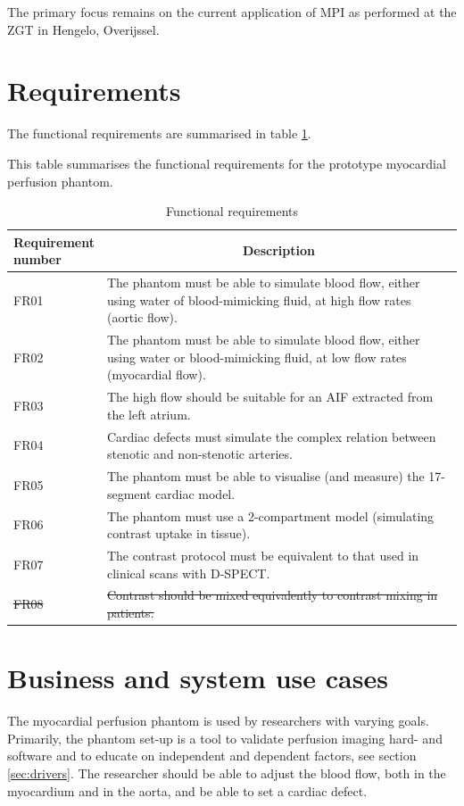 The primary focus remains on the current application of \ac{MPI} as performed at the ZGT in Hengelo, Overijssel.

\section{Requirements}
The functional requirements are summarised in table \ref{tab:funcreq}.

\begin{table}[h]
\caption{Functional requirements}
\label{tab:funcreq}
This table summarises the functional requirements for the prototype myocardial perfusion phantom.
\begin{tabular}{l|p{120mm}|}
	\makecell[l]{Requirement \\ number} & \multicolumn{1}{c}{Description}\\
	\hline
	FR01 & The phantom must be able to simulate blood flow, either using water of blood-mimicking fluid, at high flow rates (aortic flow). \\ 
	\rowcolor{Gray}
	FR02 & The phantom must be able to simulate blood flow, either using water or blood-mimicking fluid, at low flow rates (myocardial flow). \\
	FR03 & The high flow should be suitable for an \ac{AIF} extracted from the left atrium. \\
	\rowcolor{Gray}
	FR04 & Cardiac defects must simulate the complex relation between stenotic and non-stenotic arteries. \\
	FR05 & The phantom must be able to visualise (and measure) the 17-segment cardiac model. \\
	\rowcolor{Gray}
	FR06 & The phantom must use a 2-compartment model (simulating contrast uptake in tissue). \\
	FR07 & The contrast protocol must be equivalent to that used in clinical scans with D-SPECT. \\
	\rowcolor{Gray}
	\sout{FR08} & \sout{Contrast should be mixed equivalently to contrast mixing in patients.} \\
	\cline{2-2}
\end{tabular}
\end{table}

\section{Business and system use cases}	
The myocardial perfusion phantom is used by researchers with varying goals. Primarily, the phantom set-up is a tool to validate perfusion imaging hard- and software and to educate on independent and dependent factors, see section \ref{sec:drivers}. The researcher should be able to adjust the blood flow, both in the myocardium and in the aorta, and be able to set a cardiac defect.

